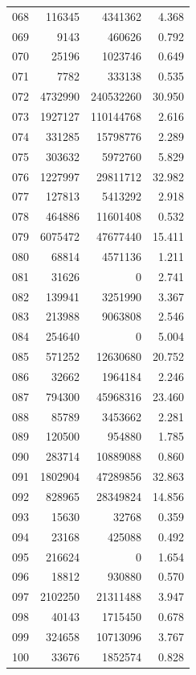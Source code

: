 \documentclass[anonymous,notoc]{gmcm2026}
\begin{document}
\begin{longtable}{lrrr}
068 & 116345 & 4341362 & 4.368 \\
069 & 9143 & 460626 & 0.792 \\
070 & 25196 & 1023746 & 0.649 \\
071 & 7782 & 333138 & 0.535 \\
072 & 4732990 & 240532260 & 30.950 \\
073 & 1927127 & 110144768 & 2.616 \\
074 & 331285 & 15798776 & 2.289 \\
075 & 303632 & 5972760 & 5.829 \\
076 & 1227997 & 29811712 & 32.982 \\
077 & 127813 & 5413292 & 2.918 \\
078 & 464886 & 11601408 & 0.532 \\
079 & 6075472 & 47677440 & 15.411 \\
080 & 68814 & 4571136 & 1.211 \\
081 & 31626 & 0 & 2.741 \\
082 & 139941 & 3251990 & 3.367 \\
083 & 213988 & 9063808 & 2.546 \\
084 & 254640 & 0 & 5.004 \\
085 & 571252 & 12630680 & 20.752 \\
086 & 32662 & 1964184 & 2.246 \\
087 & 794300 & 45968316 & 23.460 \\
088 & 85789 & 3453662 & 2.281 \\
089 & 120500 & 954880 & 1.785 \\
090 & 283714 & 10889088 & 0.860 \\
091 & 1802904 & 47289856 & 32.863 \\
092 & 828965 & 28349824 & 14.856 \\
093 & 15630 & 32768 & 0.359 \\
094 & 23168 & 425088 & 0.492 \\
095 & 216624 & 0 & 1.654 \\
096 & 18812 & 930880 & 0.570 \\
097 & 2102250 & 21311488 & 3.947 \\
098 & 40143 & 1715450 & 0.678 \\
099 & 324658 & 10713096 & 3.767 \\
100 & 33676 & 1852574 & 0.828 \\
\end{longtable}
\end{document}
